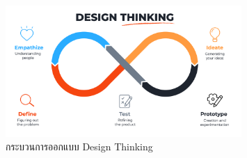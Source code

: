 \begin{enumerate}
          \begin{figure}
              \begin{center}
                  \includegraphics[width=0.8\textwidth]{img/design-thinking.png}
              \end{center}
              \caption{กระบวนการออกแบบ Design Thinking}
              \label{fig:design-thinking}
          \end{figure}

\end{enumerate}







